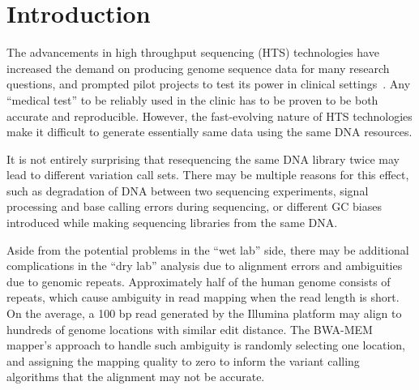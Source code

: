 \documentclass{bioinfo}
\begin{document}
\maketitle

\section{Introduction}

The advancements in high throughput sequencing (HTS) technologies have increased the demand on producing genome sequence data for many research questions, and prompted pilot projects to test its
power in clinical settings~\citep{Biesecker2009}. Any ``medical test'' to be reliably used in the clinic has to be proven to be both accurate and reproducible.
However, the fast-evolving nature of HTS technologies make it difficult to generate essentially same data using the same DNA resources. 

It is not entirely surprising that 
resequencing the same DNA library 
twice 
may lead to different variation call sets.%
There may be multiple reasons for this effect,
such as degradation of DNA between two sequencing experiments, signal processing and base calling errors during sequencing, or different GC biases introduced while making sequencing libraries from the
same DNA.%

Aside from the potential problems in the ``wet lab'' side,%
there may be additional complications in the ``dry lab'' analysis due to alignment errors and ambiguities due to genomic repeats.
Approximately half of the human genome consists of repeats, which cause ambiguity in read mapping when the read length is short. On the average, a 100 bp read generated by the Illumina platform may align to hundreds of genome locations with similar edit distance. 
The BWA-MEM~\citep{Li2009a,Li2013} mapper's  approach to handle such ambiguity is randomly selecting one location, and assigning the mapping quality to zero to inform the variant calling algorithms that the alignment may not be accurate. 
\end{document}
